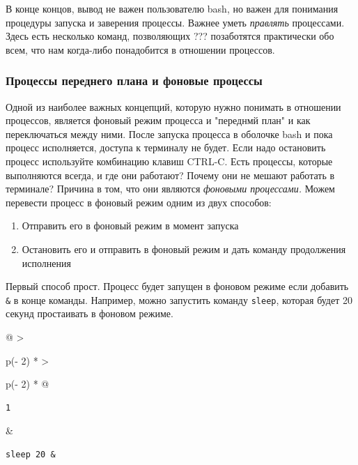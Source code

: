 \documentclass{report}
\begin{document}
В конце концов, вывод не важен пользователю bash, но важен для понимания
процедуры запуска и заверения процессы. Важнее уметь \emph{правлять}
процессами. Здесь есть несколько команд, позволяющих ??? позаботятся
практически обо всем, что нам когда-либо понадобится в отношении
процессов.

\hypertarget{Foreground-vs-Background-Processes}{%
\subsubsection{\texorpdfstring{\protect\hyperlink{Foreground-vs-Background-Processes}{}Процессы
переднего плана и фоновые
процессы}{Процессы переднего плана и фоновые процессы}}\label{Foreground-vs-Background-Processes}}

Одной из наиболее важных концепций, которую нужно понимать в отношении
процессов, является фоновый режим процесса и "переднмй план" и как
переключаться между ними. После запуска процесса в оболочке bash и пока
процесс исполняется, доступа к терминалу не будет. Если надо остановить
процесс используйте комбинацию клавиш CTRL-C. Есть процессы, которые
выполняются всегда, и где они работают? Почему они не мешают работать в
терминале? Причина в том, что они являются \emph{фоновыми процессами.}
Можем перевести процесс в фоновый режим одним из двух способов:

\begin{enumerate}
\tightlist
\item
  Отправить его в фоновый режим в момент запуска
\item
  Остановить его и отправить в фоновый режим и дать команду продолжения
  исполнения
\end{enumerate}

Первый способ прост. Процесс будет запущен в фоновом режиме если
добавить \texttt{\&} в конце команды. Например, можно запустить команду
\texttt{sleep}, которая будет 20 секунд простаивать в фоновом режиме.

\begin{longtable}[]{@{}
  >{\raggedright\arraybackslash}p{(\columnwidth - 2\tabcolsep) * }
  >{\raggedright\arraybackslash}p{(\columnwidth - 2\tabcolsep) * }@{}}
\toprule
\endhead
\begin{minipage}[t]{\linewidth}\raggedright
\begin{verbatim}
1
\end{verbatim}
\end{minipage} & \begin{minipage}[t]{\linewidth}\raggedright
\begin{verbatim}
sleep 20 &
\end{verbatim}
\end{minipage} \\ \addlinespace
\bottomrule
\end{longtable}
\end{document}

